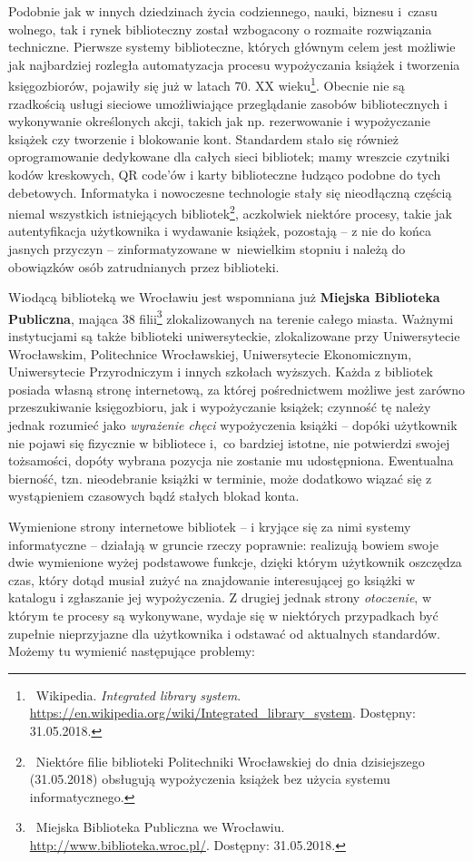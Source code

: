 \documentclass[12pt, a4paper]{article}
\begin{document}
Podobnie jak w innych dziedzinach życia codziennego, nauki, biznesu i~czasu wolnego, tak i rynek biblioteczny został wzbogacony o rozmaite rozwiązania techniczne. Pierwsze systemy biblioteczne, których głównym celem jest możliwie jak najbardziej rozległa automatyzacja procesu wypożyczania książek i tworzenia księgozbiorów, pojawiły się już w latach 70. XX wieku\footnote{\ Wikipedia. \textit{Integrated library system}. \url{https://en.wikipedia.org/wiki/Integrated_library_system}. Dostępny: 31.05.2018.}. Obecnie nie są rzadkością usługi sieciowe umożliwiające przeglądanie zasobów bibliotecznych i wykonywanie określonych akcji, takich jak np. rezerwowanie i wypożyczanie książek czy tworzenie i blokowanie kont. Standardem stało się również oprogramowanie dedykowane dla całych sieci bibliotek; mamy wreszcie czytniki kodów kreskowych, QR code'ów i karty biblioteczne łudząco podobne do tych debetowych. Informatyka i nowoczesne technologie stały się nieodłączną częścią niemal wszystkich istniejących bibliotek\footnote{\ Niektóre filie biblioteki Politechniki Wrocławskiej do dnia dzisiejszego (31.05.2018) obsługują wypożyczenia książek bez użycia systemu informatycznego.}, aczkolwiek niektóre procesy, takie jak autentyfikacja użytkownika i wydawanie książek, pozostają -- z nie do końca jasnych przyczyn -- zinformatyzowane w~niewielkim stopniu i należą do obowiązków osób zatrudnianych przez biblioteki.

Wiodącą biblioteką we Wrocławiu jest wspomniana już \textbf{Miejska Biblioteka Publiczna}, mająca 38 filii\footnote{\ Miejska Biblioteka Publiczna we Wrocławiu.\\\url{http://www.biblioteka.wroc.pl/}. Dostępny: 31.05.2018.} zlokalizowanych na terenie całego miasta. Ważnymi instytucjami są także biblioteki uniwersyteckie, zlokalizowane przy Uniwersytecie Wrocławskim, Politechnice Wrocławskiej, Uniwersytecie Ekonomicznym, Uniwersytecie Przyrodniczym i innych szkołach wyższych. Każda z bibliotek posiada własną stronę internetową, za której pośrednictwem możliwe jest zarówno przeszukiwanie księgozbioru, jak i wypożyczanie książek; czynność tę należy jednak rozumieć jako \textit{wyrażenie chęci} wypożyczenia książki -- dopóki użytkownik nie pojawi się fizycznie w bibliotece i,~co bardziej istotne, nie potwierdzi swojej tożsamości, dopóty wybrana pozycja nie zostanie mu udostępniona. Ewentualna bierność, tzn. nieodebranie książki w terminie, może dodatkowo wiązać się z wystąpieniem czasowych bądź stałych blokad konta.

Wymienione strony internetowe bibliotek -- i kryjące się za nimi systemy informatyczne -- działają w gruncie rzeczy poprawnie: realizują bowiem swoje dwie wymienione wyżej podstawowe funkcje, dzięki którym użytkownik oszczędza czas, który dotąd musiał zużyć na znajdowanie interesującej go książki w katalogu i zgłaszanie jej wypożyczenia. Z drugiej jednak strony \textit{otoczenie}, w którym te procesy są wykonywane, wydaje się w niektórych przypadkach być zupełnie nieprzyjazne dla użytkownika i odstawać od aktualnych standardów. Możemy tu wymienić następujące problemy:\\
\end{document}
